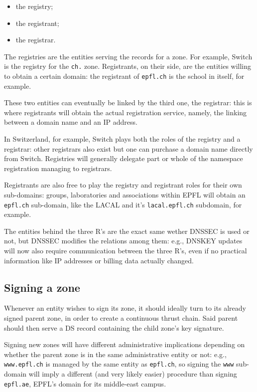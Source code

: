 \documentclass[a4paper,twocolumn]{scrartcl}
\begin{document}
\begin{itemize}
\item the registry;
\item the registrant;
\item the registrar.
\end{itemize}

The registries are the entities serving the records for a zone. For example, Switch is the registry for the \verb|ch.| zone. Registrants, on their side, are the entities willing to obtain a certain domain: the registrant of \verb|epfl.ch| is the school in itself, for example.

These two entities can eventually be linked by the third one, the registrar: this is where registrants will obtain the actual registration service, namely, the linking between a domain name and an IP address.

In Switzerland, for example, Switch plays both the roles of the registry and a registrar: other registrars also exist but one can purchase a domain name directly from Switch. Registries will generally delegate part or whole of the namespace registration managing to registrars.

Registrants are also free to play the registry and registrant roles for their own sub-domains: groups, laboratories and associations within EPFL will obtain an \verb|epfl.ch| sub-domain, like the LACAL and it's \verb|lacal.epfl.ch| subdomain, for example.

The entities behind the three R's are the exact same wether DNSSEC is used or not, but DNSSEC modifies the relations among them: e.g., DNSKEY updates will now also require communication between the three R's, even if no practical information like IP addresses or billing data actually changed.

\subsection{Signing a zone}
Whenever an entity wishes to sign its zone, it should ideally turn to its already signed parent zone, in order to create a continuous thrust chain.
Said parent should then serve a DS record containing the child zone's key signature.

Signing new zones will have different administrative implications depending on whether the parent zone is in the same administrative entity or not: e.g., \verb|www.epfl.ch| is managed by the same entity as \verb|epfl.ch|, so signing the \verb|www| sub-domain will imply a different (and very likely easier) procedure than signing \verb|epfl.ae|, EPFL's domain for its middle-east campus.
\end{document}
